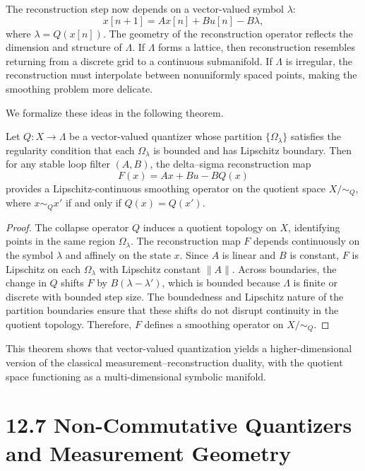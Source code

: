 The reconstruction step now depends on a vector-valued symbol $\lambda$:
\[
x[n+1] = A x[n] + B u[n] - B \lambda,
\]
where $\lambda = Q(x[n])$. The geometry of the reconstruction operator reflects the dimension and structure of $\Lambda$. If $\Lambda$ forms a lattice, then reconstruction resembles returning from a discrete grid to a continuous submanifold. If $\Lambda$ is irregular, the reconstruction must interpolate between nonuniformly spaced points, making the smoothing problem more delicate.

We formalize these ideas in the following theorem.

\begin{theorem}
Let $Q : X \to \Lambda$ be a vector-valued quantizer whose partition $\{\Omega_{\lambda}\}$ satisfies the regularity condition that each $\Omega_{\lambda}$ is bounded and has Lipschitz boundary. Then for any stable loop filter $(A,B)$, the delta--sigma reconstruction map
\[
F(x) = A x + B u - B Q(x)
\]
provides a Lipschitz-continuous smoothing operator on the quotient space $X/\!\sim_{Q}$, where $x \sim_{Q} x'$ if and only if $Q(x) = Q(x')$.
\end{theorem}

\begin{proof}
The collapse operator $Q$ induces a quotient topology on $X$, identifying points in the same region $\Omega_{\lambda}$. The reconstruction map $F$ depends continuously on the symbol $\lambda$ and affinely on the state $x$. Since $A$ is linear and $B$ is constant, $F$ is Lipschitz on each $\Omega_{\lambda}$ with Lipschitz constant $\|A\|$. Across boundaries, the change in $Q$ shifts $F$ by $B(\lambda - \lambda')$, which is bounded because $\Lambda$ is finite or discrete with bounded step size. The boundedness and Lipschitz nature of the partition boundaries ensure that these shifts do not disrupt continuity in the quotient topology. Therefore, $F$ defines a smoothing operator on $X/\!\sim_{Q}$.
\end{proof}

This theorem shows that vector-valued quantization yields a higher-dimensional version of the classical measurement--reconstruction duality, with the quotient space functioning as a multi-dimensional symbolic manifold.

\section*{12.7 Non-Commutative Quantizers and Measurement Geometry}

